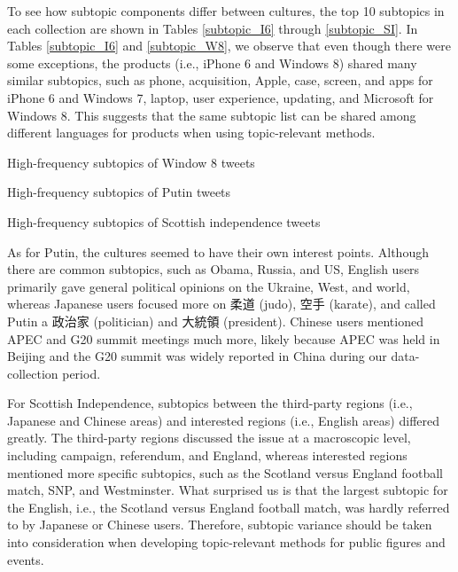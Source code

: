 \documentclass[english]{jnlp_1.4}
\begin{document}
To see how subtopic components differ between cultures, the top 10 subtopics in each collection are shown in Tables \ref{subtopic_I6} through \ref{subtopic_SI}. In Tables \ref{subtopic_I6} and \ref{subtopic_W8}, we observe that even though there were some exceptions, the products (i.e., iPhone 6 and Windows 8) shared many similar subtopics, such as phone, acquisition, Apple, case, screen, and apps for iPhone 6 and Windows 7, laptop, user experience, updating, and Microsoft for Windows 8. This suggests that the same subtopic list can be shared among different languages for products when using topic-relevant methods.

\begin{table}[p]
\caption{High-frequency subtopics of Window 8 tweets}
\label{subtopic_W8}

\end{table}
\begin{table}[p]
\caption{High-frequency subtopics of Putin tweets}
\label{subtopic_PU}

\end{table}
\begin{table}[p]
\caption{High-frequency subtopics of Scottish independence tweets}
\label{subtopic_SI}

\end{table}

As for Putin, the cultures seemed to have their own interest points. Although there are common subtopics, such as Obama, Russia, and US, English users primarily gave general political opinions on the Ukraine, West, and world, whereas Japanese users focused more on 柔道 (judo), 空手 (karate), and called Putin a 政治家 (politician) and 大統領 (president). Chinese users mentioned APEC and G20 summit meetings much more, likely because APEC was held in Beijing and the G20 summit was widely reported in China during our data-collection period.

For Scottish Independence, subtopics between the third-party regions (i.e., Japanese and Chinese areas) and interested regions (i.e., English areas) differed greatly. The third-party regions discussed the issue at a macroscopic level, including campaign, referendum, and England, whereas interested regions mentioned more specific subtopics, such as the Scotland versus England football match, SNP, and Westminster. What surprised us is that the largest subtopic for the English, i.e., the Scotland versus England football match, was hardly referred to by Japanese or Chinese users. Therefore, subtopic variance should be taken into consideration when developing topic-relevant methods for public figures and events.
\end{document}
